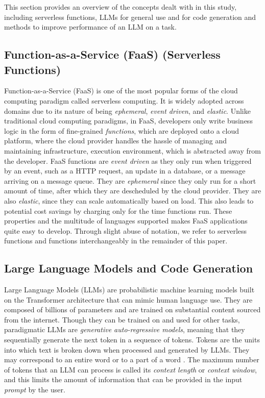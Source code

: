 This section provides an overview of the concepts dealt with in this study, including serverless functions, LLMs for general use and for code generation and methods to improve performance of an LLM on a task.

\vspace*{-2.5mm}

\subsection{Function-as-a-Service (FaaS) (Serverless Functions)} \label{backg:faas}

Function-as-a-Service (FaaS) is one of the most popular forms of the cloud computing paradigm called serverless computing\cite{wen2023rise_serverlessslr}. It is widely adopted across domains due to its nature of being \textit{ephemeral}, \textit{event driven}, and \textit{elastic}. Unlike traditional cloud computing paradigms, in FaaS, developers only write business logic in the form of fine-grained \textit{functions}, which are deployed onto a cloud platform, where the cloud provider handles the hassle of managing and maintaining infrastructure, execution environment, which is abstracted away from the developer. FaaS functions are \textit{event driven} as they only run when triggered by an event, such as a HTTP request, an update in a database, or a message arriving on a message queue. They are \textit{ephemeral} since they only run for a short amount of time, after which they are descheduled by the cloud provider. They are also \textit{elastic}, since they can scale automatically based on load. This also leads to potential cost savings by charging only for the time functions run. These properties and the multitude of languages supported makes FaaS applications quite easy to develop. Through slight abuse of notation, we refer to serverless functions and functions interchangeably in the remainder of this paper.

\subsection{Large Language Models and Code Generation}\label{backg:llm}
Large Language Models (LLMs) are probabilistic machine learning models built on the Transformer architecture \cite{vaswani2017attention} that can mimic human language use. They are composed of billions of parameters and are trained on substantial content sourced from the internet. Though they can be trained on and used for other tasks, paradigmatic LLMs are \textit{generative auto-regressive models}, meaning that they sequentially generate the next token in a sequence of tokens. Tokens are the units into which text is broken down when processed and generated by LLMs. They may correspond to an entire word or to a part of a word \cite{sennrich-etal-2016-bpe}. The maximum number of tokens that an LLM can process is called its \textit{context length} or \textit{context window}, and this limits the amount of information that can be provided in the input \textit{prompt} by the user.  

